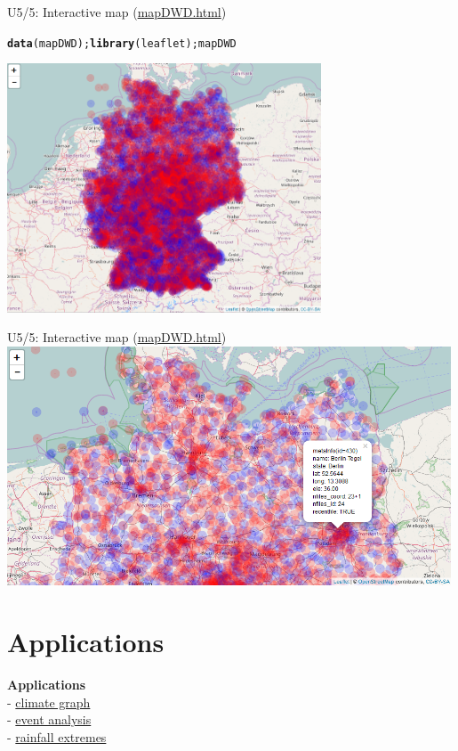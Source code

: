 \documentclass[compress, xcolor=dvipsnames]{beamer}\usepackage[]{graphicx}\usepackage[]{color}
\makeatletter
\newcommand{\hlstd}[1]{\textcolor[rgb]{0.345,0.345,0.345}{#1}}%
\newcommand{\hlkwd}[1]{\textcolor[rgb]{0.737,0.353,0.396}{\textbf{#1}}}%
\newenvironment{kframe}{%
 \def\at@end@of@kframe{}%
 \ifinner\ifhmode%
  \def\at@end@of@kframe{\end{minipage}}%
  \begin{minipage}{\columnwidth}%
 \fi\fi%
 \def\FrameCommand##1{\hskip\@totalleftmargin \hskip-\fboxsep
 \colorbox{shadecolor}{##1}\hskip-\fboxsep
     \hskip-\linewidth \hskip-\@totalleftmargin \hskip\columnwidth}%
 \MakeFramed {\advance\hsize-\width
   \@totalleftmargin\z@ \linewidth\hsize
   \@setminipage}}%
 {\par\unskip\endMakeFramed%
 \at@end@of@kframe}
\newenvironment{knitrout}{}{} %
\makeatother
\begin{document}
\begin{frame}[fragile]{U5/5: Interactive map (\href{../inst/doc/mapDWD.html}{mapDWD.html})}
\label{um}
\begin{knitrout}
\color{fgcolor}\begin{kframe}
\begin{alltt}
\hlkwd{data}\hlstd{(mapDWD)  ;}  \hlkwd{library}\hlstd{(leaflet)  ;  mapDWD}
\end{alltt}
\end{kframe}
\end{knitrout}
\includegraphics[width=0.7\textwidth]{map1.png}
\end{frame}


\begin{frame}[fragile]{U5/5: Interactive map (\href{../inst/doc/mapDWD.html}{mapDWD.html})}
\includegraphics[width=0.99\textwidth]{map2.png}
\end{frame}

\section{Applications}
\begin{frame}
\textbf{Applications}\\[1em]
- \hyperlink{ac}{climate graph}\\
- \hyperlink{ae}{event analysis}\\
- \hyperlink{ar}{rainfall extremes}\\
\end{frame}
\end{document}
